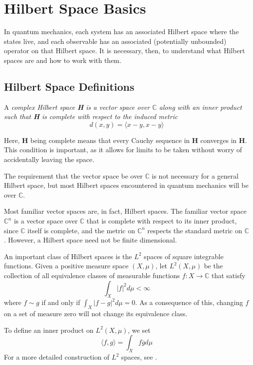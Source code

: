\section{Hilbert Space Basics}
In quantum mechanics, each system has an associated Hilbert space where the
states live, and each observable has an associated (potentially unbounded)
operator on that Hilbert space. It is necessary, then, to understand what
Hilbert spaces are and how to work with them.

\subsection{Hilbert Space Definitions}
A \em complex Hilbert space \em \textbf{H} is a vector space over $\mathbb{C}$
along with an inner product such that \textbf{H} is complete with respect to the
induced metric
\[
d(x,y) = \langle x-y,x-y\rangle
\]
\cite[p. 8]{MacCluer2009}

Here, \textbf{H} being complete means that every Cauchy sequence in \textbf{H}
converges in \textbf{H}. This condition is important, as it allows for limits to
be taken without worry of accidentally leaving the space.

The requirement that the vector space be over $\mathbb{C}$ is not necessary for
a general Hilbert space, but most Hilbert spaces encountered in quantum
mechanics will be over $\mathbb{C}$.

Most familiar vector spaces are, in fact, Hilbert spaces. The familiar vector
space $\mathbb{C}^n$ is a vector space over $\mathbb{C}$ that is complete with
respect to its inner product, since $\mathbb{C}$ itself is complete, and the
metric on $\mathbb{C}^n$ respects the standard metric on $\mathbb{C}$. However,
a Hilbert space need not be finite dimensional.

\begin{example}
An important class of Hilbert spaces is the $L^2$ spaces of square integrable
functions. Given a positive %
measure space $(X,\mu)$, let $L^2(X,\mu)$ be the collection of all equivalence
classes of measurable functions $f: X \to \mathbb{C}$ that satisfy
\[
    \int_X |f|^2d\mu < \infty
\]
where $f\sim g$ if and only if $\int_X |f-g|^2d\mu = 0$. As a consequence of
this, changing $f$ on a set of measure zero will not change its equivalence
class.

To define an inner product on $L^2(X,\mu)$, we set
\[
    \langle f,g \rangle = \int_X f\overline{g}d\mu
\]
For a more detailed construction of $L^2$ spaces, see \cite[p.
    181-185]{Lang1993}.
\end{example}


